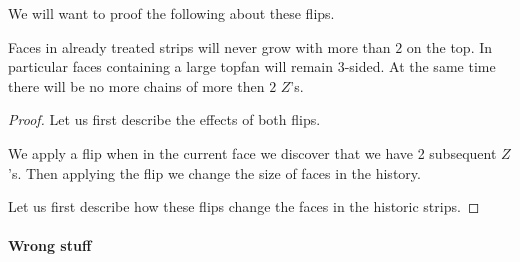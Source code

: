 

We will want to proof the following about these flips.

\begin{lemma}
  \label{lm:}
  Faces in already treated strips will never grow with more than $2$ on the top. In particular faces containing a large topfan will remain 3-sided. At the same time there will be no more chains of more then $2$ $Z$'s.
\end{lemma}

\begin{proof}
  Let us first describe the effects of both flips.

  We apply a flip when in the current face we discover that we have 2 subsequent $Z$'s. Then applying the flip we change the size of faces in the history. 

  Let us first describe how these flips change the faces in the historic strips.

\end{proof}



\paragraph{Wrong stuff}

